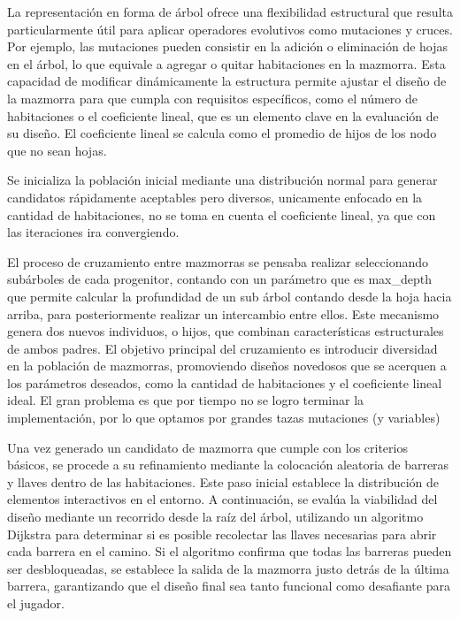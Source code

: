 \documentclass[letter, 10pt]{article}
\begin{document}
La representaci\'on en forma de \'arbol ofrece una flexibilidad estructural que resulta particularmente \'util para aplicar operadores evolutivos como mutaciones y cruces. Por ejemplo, las mutaciones pueden consistir en la adici\'on o eliminaci\'on de hojas en el \'arbol, lo que equivale a agregar o quitar habitaciones en la mazmorra. Esta capacidad de modificar din\'amicamente la estructura permite ajustar el dise\~no de la mazmorra para que cumpla con requisitos espec\'ificos, como el n\'umero de habitaciones o el coeficiente lineal, que es un elemento clave en la evaluaci\'on de su dise\~no. El coeficiente lineal se calcula como el promedio de hijos de los nodo que no sean hojas.

Se inicializa la poblaci\'on inicial mediante una distribuci\'on normal para generar candidatos r\'apidamente aceptables pero diversos, unicamente enfocado en la cantidad de habitaciones, no se toma en cuenta el coeficiente lineal, ya que con las iteraciones ira convergiendo.

El proceso de cruzamiento entre mazmorras se pensaba realizar seleccionando sub\'arboles de cada progenitor, contando con un par\'ametro que es max\_depth que permite calcular la profundidad de un sub \'arbol contando desde la hoja hacia arriba, para posteriormente realizar un intercambio entre ellos. Este mecanismo genera dos nuevos individuos, o hijos, que combinan caracter\'isticas estructurales de ambos padres. El objetivo principal del cruzamiento es introducir diversidad en la poblaci\'on de mazmorras, promoviendo dise\~nos novedosos que se acerquen a los par\'ametros deseados, como la cantidad de habitaciones y el coeficiente lineal ideal. El gran problema es que por tiempo no se logro terminar la implementaci\'on, por lo que optamos por grandes tazas mutaciones (y variables)

Una vez generado un candidato de mazmorra que cumple con los criterios b\'asicos, se procede a su refinamiento mediante la colocaci\'on aleatoria de barreras y llaves dentro de las habitaciones. Este paso inicial establece la distribuci\'on de elementos interactivos en el entorno. A continuaci\'on, se eval\'ua la viabilidad del dise\~no mediante un recorrido desde la ra\'iz del \'arbol, utilizando un algoritmo Dijkstra para determinar si es posible recolectar las llaves necesarias para abrir cada barrera en el camino. Si el algoritmo confirma que todas las barreras pueden ser desbloqueadas, se establece la salida de la mazmorra justo detr\'as de la \'ultima barrera, garantizando que el dise\~no final sea tanto funcional como desafiante para el jugador.
\end{document}
